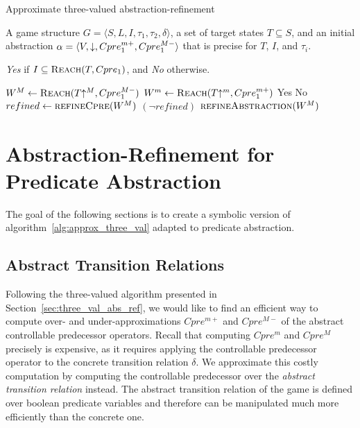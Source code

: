 \begin{algorithm}
\caption{Approximate three-valued abstraction-refinement}
\label{alg:approx_three_val}

\begin{algorithmic}[1]

 A game structure $G = \langle S, L, I, \tau_1, \tau_2, \delta \rangle$, a set of target states $T\subseteq S$, and an initial abstraction $\alpha=\langle V, \mathord{\downarrow}, Cpre_1^{m+}, Cpre_1^{M-} \rangle$ that is precise for $T$, $I$, and $\tau_i$.

 {\it Yes} if $I \subseteq \textsc{Reach}(T, Cpre_1)$, and {\it No} otherwise.

    \Loop
        \State $W^M \gets \textsc{Reach}(T\mathord{\uparrow^M}, Cpre_1^{M-})$
        \State $W^m \gets \textsc{Reach}(T\mathord{\uparrow^m}, Cpre_1^{m+})$
         \Return Yes \label{alg:atv:t1}
         \Return No \label{alg:atv:t2}
        \Else       
            \State $refined \gets \Call{refineCpre}{W^M}$
            \State \algorithmicif{} {$(\neg refined)$}
                $\Call{refineAbstraction}{W^M}$
            \algorithmicend \algorithmicif
        \EndIf
    \EndLoop
\EndFunction

\end{algorithmic}
\end{algorithm}

\section{Abstraction-Refinement for Predicate Abstraction}

The goal of the following sections is to create a symbolic version of algorithm~\ref{alg:approx_three_val} adapted to predicate abstraction.

\subsection{Abstract Transition Relations}
\label{s:cpre}

Following the three-valued algorithm presented in Section~\ref{sec:three_val_abs_ref}, we would like to find an efficient way to compute over- and under-approximations $Cpre^{m+}$ and $Cpre^{M-}$ of the abstract controllable predecessor operators. Recall that computing $Cpre^m$ and $Cpre^M$ precisely is expensive, as it requires applying the controllable predecessor operator to the concrete transition relation $\delta$. We approximate this costly computation by computing the controllable predecessor over the \emph{abstract transition relation} instead. The abstract transition relation of the game is defined over boolean predicate variables and therefore can be manipulated much more efficiently than the concrete one.

